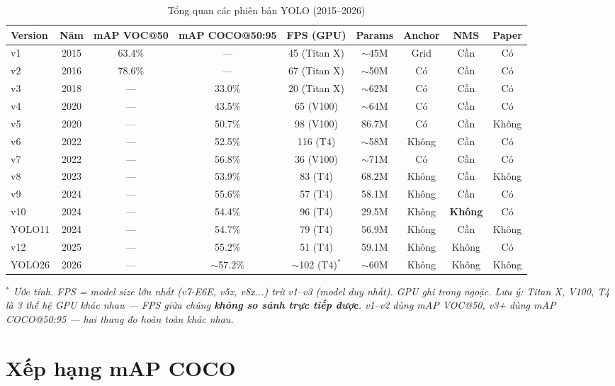 \documentclass[12pt,a4paper]{report}
\begin{document}
\begin{table}[H]\centering
\caption{Tổng quan các phiên bản YOLO (2015--2026)}
\scriptsize
\begin{tabular}{lcccccccc}\toprule
\textbf{Version} & \textbf{Năm} & \textbf{mAP VOC@50} & \textbf{mAP COCO@50:95} & \textbf{FPS (GPU)} & \textbf{Params} & \textbf{Anchor} & \textbf{NMS} & \textbf{Paper}\\\midrule
v1 \cite{yolov1} & 2015 & 63.4\% & --- & 45 (Titan X) & $\sim$45M & Grid & Cần & Có \\
v2 \cite{yolov2} & 2016 & 78.6\% & --- & 67 (Titan X) & $\sim$50M & Có & Cần & Có \\
v3 \cite{yolov3} & 2018 & --- & 33.0\% & 20 (Titan X) & $\sim$62M & Có & Cần & Có \\
v4 \cite{yolov4} & 2020 & --- & 43.5\% & 65 (V100) & $\sim$64M & Có & Cần & Có \\
v5 \cite{yolov5} & 2020 & --- & 50.7\% & 98 (V100) & 86.7M & Có & Cần & Không \\
v6 \cite{yolov6} & 2022 & --- & 52.5\% & 116 (T4) & $\sim$58M & Không & Cần & Có \\
v7 \cite{yolov7} & 2022 & --- & 56.8\% & 36 (V100) & $\sim$71M & Có & Cần & Có \\
v8 \cite{yolov8} & 2023 & --- & 53.9\% & 83 (T4) & 68.2M & Không & Cần & Không \\
v9 \cite{yolov9} & 2024 & --- & 55.6\% & 57 (T4) & 58.1M & Không & Cần & Có \\
v10 \cite{yolov10} & 2024 & --- & 54.4\% & 96 (T4) & 29.5M & Không & \textbf{Không} & Có \\
YOLO11 \cite{yolo11} & 2024 & --- & 54.7\% & 79 (T4) & 56.9M & Không & Cần & Không \\
v12 \cite{yolov12} & 2025 & --- & 55.2\% & 51 (T4) & 59.1M & Không & Không & Có \\
YOLO26 \cite{yolo26} & 2026 & --- & $\sim$57.2\% & $\sim$102 (T4)$^*$ & $\sim$60M & Không & Không & Không \\
\bottomrule
\end{tabular}
\end{table}

\textit{$^*$ Ước tính. FPS = model size lớn nhất (v7-E6E, v5x, v8x...) trừ v1--v3 (model duy nhất). GPU ghi trong ngoặc. Lưu ý: Titan X, V100, T4 là 3 thế hệ GPU khác nhau --- FPS giữa chúng \textbf{không so sánh trực tiếp được}. v1--v2 dùng mAP VOC@50, v3+ dùng mAP COCO@50:95 --- hai thang đo hoàn toàn khác nhau.}

\section{Xếp hạng mAP COCO}
\end{document}
